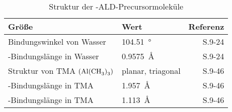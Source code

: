 \begin{table}[H]
  \centering
  \caption{Struktur der -ALD-Precursormoleküle}
  \evenrowcolors
  \begin{tabularx}{\textwidth}{|XXR|}
    \hline
    \textbf{Größe}                                & \textbf{Wert}          & \textbf{Referenz}             \\
    \hline
    Bindungswinkel von Wasser                     & \SI{104.51}{\degree}   & \cite{haynes_crc_2011} S.9-24 \\
    -Bindungslänge in Wasser              & \SI{0.9575}{\angstrom} & \cite{haynes_crc_2011} S.9-24 \\
    Struktur von TMA $\left(\ce{Al(CH3)3}\right)$ & planar, triagonal      & \cite{haynes_crc_2011} S.9-46 \\
    -Bindungslänge in TMA                & \SI{1.957}{\angstrom}  & \cite{haynes_crc_2011} S.9-46 \\
    -Bindungslänge in TMA                 & \SI{1.113}{\angstrom}  & \cite{haynes_crc_2011} S.9-46 \\
    \hline
  \end{tabularx}

\end{table}
